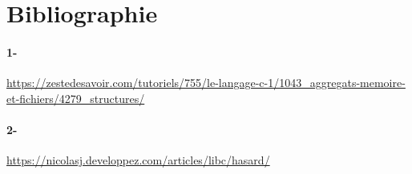 \documentclass[a4paper, 12pt]{article}
\begin{document}
   \appendix  %
   \section{Bibliographie}
   \paragraph{1- }
    \url{https://zestedesavoir.com/tutoriels/755/le-langage-c-1/1043_aggregats-memoire-et-fichiers/4279_structures/}
    \paragraph{2- }
    \url{https://nicolasj.developpez.com/articles/libc/hasard/}
\end{document}
